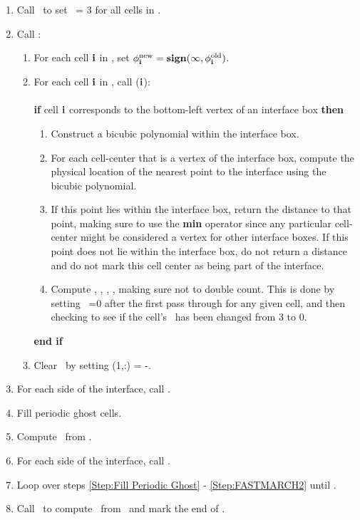 \section{\REINIT}
\begin{enumerate}
\item Call \RETYPIFY~to set \type~= 3 for all cells in \nband.
\item Call \FINDINTRFCE:
\begin{enumerate}
\item For each cell ${\bf i}$ in \nband, set $\phi_{\bf i}^{\rm new} = {\tt{\bf sign}}(\infty,\phi_{\bf i}^{\rm old})$.
\item For each cell ${\bf i}$ in \nband, call \UPDATEF(${\bf i}$):\\ \\
{\bf if} cell ${\bf i}$ corresponds to the bottom-left vertex of an interface box {\bf then}
\begin{enumerate}
\item Construct a bicubic polynomial within the interface box.
\item For each cell-center that is a vertex of the interface box, compute the physical location of the nearest point to the interface using the bicubic polynomial.
\item If this point lies within the interface box, return the distance to that point, making sure to use the {\bf min} operator since any particular cell-center might be considered a vertex for other interface boxes.  If this point does not lie within the interface box, do not return a distance and do not mark this cell center as being part of the interface.
\item Compute \intfacep, \intfacenump, \intfacen, \intfacenumn, making sure not to double count.  This is done by setting \type~=0 after the first pass through for any given cell, and then checking to see if the cell's \type~has been changed from 3 to 0.
\end{enumerate}
{\bf end if}\\
\item Clear \nband~by setting \nband(1,:) = -\LARGEINT.
\end{enumerate}
\item For each side of the interface, call \FASTMARCH.
\item \label{Step:Fill Periodic Ghost} Fill periodic ghost cells.
\item Compute \nbandnum~from \nband.
\item \label{Step:FASTMARCH2} For each side of the interface, call .
\item Loop over steps \ref{Step:Fill Periodic Ghost} - \ref{Step:FASTMARCH2} until \done.
\item Call \MINE~to compute \mine~from \type~and mark the end of \mine.
\end{enumerate}
